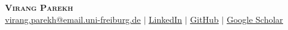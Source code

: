 \documentclass[../../resume]{subfiles}
\begin{document}
\begin{center}
    \textbf{\Huge \scshape Virang Parekh} \\ \vspace{1pt}
    \href{mailto:virang.parekh@email.uni-freiburg.de}{\underline{virang.parekh@email.uni-freiburg.de}} $|$ 
    \href{https://www.linkedin.com/in/virang-parekh/}{\underline{LinkedIn}} $|$
    \href{https://github.com/VirangParekh}{\underline{GitHub}} $|$
    \href{https://scholar.google.com/citations?user=7OuFvOQAAAAJ&hl=en&authuser=1}{\underline{Google Scholar}}
\end{center}
\end{document}
